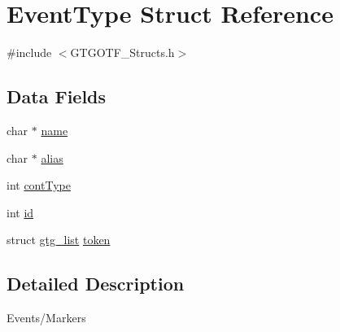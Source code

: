 \hypertarget{structEventType}{\section{Event\-Type Struct Reference}
\label{structEventType}
}


{\ttfamily \#include $<$G\-T\-G\-O\-T\-F\-\_\-\-Structs.\-h$>$}

\subsection*{Data Fields}
\begin{DoxyCompactItemize}
\item 
char $\ast$ \hyperlink{structEventType_a0c5cf0d1d90a0190925feab828dba2e8}{name}
\item 
char $\ast$ \hyperlink{structEventType_a42f50ba031cb2fe4d5bffe085f6ad2c6}{alias}
\item 
int \hyperlink{structEventType_afdddbef3fe86529f251fb05fa3445383}{cont\-Type}
\item 
int \hyperlink{structEventType_a29c1aa6026157172fa5c5425105be105}{id}
\item 
struct \hyperlink{structgtg__list}{gtg\-\_\-list} \hyperlink{structEventType_af6aadf2a0a0a3b8c4d0fe57d4889bbf9}{token}
\end{DoxyCompactItemize}


\subsection{Detailed Description}
Events/\-Markers 

